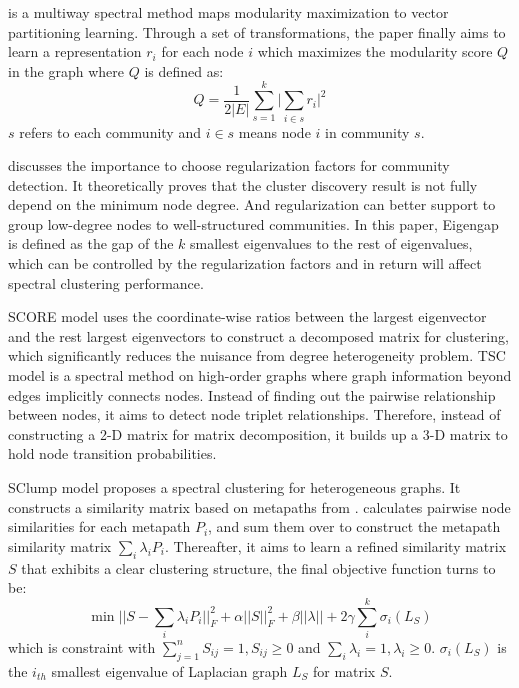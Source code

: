 \cite{zhang2015multiway} is a multiway spectral method maps modularity maximization to vector partitioning learning. Through a set of transformations, the paper finally aims to learn a representation $r_i$ for each node $i$ which maximizes the modularity score $Q$ in the graph where $Q$ is defined as:
\begin{equation}
	Q = \frac{1}{2|E|}\sum_{s=1}^{k}\big |\sum_{i \in s}r_i \big |^2
\end{equation}
 $s$ refers to each community and $i \in s$ means node $i$ in community $s$.

\cite{joseph2016impact} discusses the importance to choose regularization factors for community detection. It theoretically proves that the cluster discovery result is not fully depend on the minimum node degree. And regularization can better support to group low-degree nodes to well-structured communities. In this paper, Eigengap is defined as the gap of the $k$ smallest eigenvalues to the rest of eigenvalues, which can be controlled by the regularization factors and in return will affect spectral clustering performance.

SCORE model \cite{jin2015fast} uses the coordinate-wise ratios between the largest eigenvector and the rest largest eigenvectors to construct a decomposed matrix for clustering, which significantly reduces the nuisance from degree heterogeneity problem. TSC model \cite{benson2015tensor} is a spectral method on high-order graphs where graph information beyond edges implicitly connects nodes. Instead of finding out the pairwise relationship between nodes, it aims to detect node triplet relationships. Therefore, instead of constructing a 2-D matrix for matrix decomposition, it builds up a 3-D matrix to hold node transition probabilities. 

SClump model \cite{li2019spectral} proposes a spectral clustering for heterogeneous graphs. It constructs a similarity matrix based on metapaths from \cite{sun2013pathselclus}. \cite{sun2013pathselclus} calculates pairwise node similarities for each metapath $P_i$, and sum them over to construct the metapath similarity matrix $\sum_{i} \lambda_i P_i$. Thereafter, it aims to learn a refined similarity matrix $S$ that exhibits a clear clustering structure, the final objective function turns to be:
\begin{equation}
\min ||S-\sum_{i} \lambda_i P_i||^2_F + \alpha ||S||^2_F + \beta ||\lambda|| + 2 \gamma\sum_{i}^k\sigma_i(L_S)
\end{equation}
which is constraint with $\sum_{j=1}^n S_{ij} = 1, S_{ij} \geq 0$ and $\sum_{i}\lambda_i = 1, \lambda_i \geq 0$. $\sigma_i(L_S)$ is the $i_{th}$ smallest eigenvalue of Laplacian graph $L_S$ for matrix $S$.

